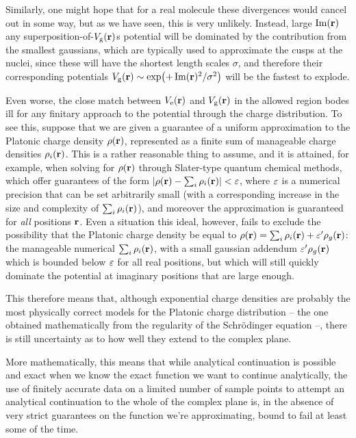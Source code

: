 Similarly, one might hope that for a real molecule these divergences would cancel out in some way, but as we have seen, this is very unlikely. Instead, large $\Im(\vb{r})$ any superposition-of-$V_\mathrm{g}(\vb{r})$s potential will be dominated by the contribution from the smallest gaussians, which are typically used to approximate the cusps at the nuclei, since these will have the shortest length scales $\sigma$, and therefore their corresponding potentials $V_\mathrm{g}(\vb{r})\sim \exp(+\Im(\vb{r})^2/\sigma^2)$ will be the fastest to explode.


Even worse, the close match between $V_\mathrm{e}(\vb{r})$ and $V_\mathrm{g}(\vb{r})$ in the allowed region bodes ill for any finitary approach to the potential through the charge distribution. To see this, suppose that we are given a guarantee of a uniform approximation to the Platonic charge density $\rho(\vb{r})$, represented as a finite sum of manageable charge densities $\rho_i(\vb{r})$. This is a rather reasonable thing to assume, and it is attained, for example, when solving for $\rho(\vb{r})$ through Slater-type quantum chemical methods, which offer guarantees of the form $\left|\rho(\vb{r})-\sum_i\rho_i(\vb{r})\right|<\varepsilon$, where $\varepsilon$ is a numerical precision that can be set arbitrarily small (with a corresponding increase in the size and complexity of $\sum_i\rho_i(\vb{r})$), and moreover the approximation is guaranteed for \textit{all} positions $\vb{r}$. Even a situation this ideal, however, fails to exclude the possibility that the Platonic charge density be equal to $\rho(\vb{r}) = \sum_i\rho_i(\vb{r}) + \varepsilon'\rho_g(\vb{r})$: the manageable numerical $\sum_i\rho_i(\vb{r})$, with a small gaussian addendum $\varepsilon'\rho_g(\vb{r})$ which is bounded below $\varepsilon$ for all real positions, but which will still quickly dominate the potential at imaginary positions that are large enough.



This therefore means that, although exponential charge densities are probably the most physically correct models for the Platonic charge distribution -- the one obtained mathematically from the regularity of the Schrödinger equation --, there is still uncertainty as to how well they extend to the complex plane. 

More mathematically, this means that while analytical continuation is possible and exact when we know the exact function we want to continue analytically, the use of finitely accurate data on a limited number of sample points to attempt an analytical continuation to the whole of the complex plane is, in the absence of very strict guarantees on the function we're approximating, bound to fail at least some of the time.




